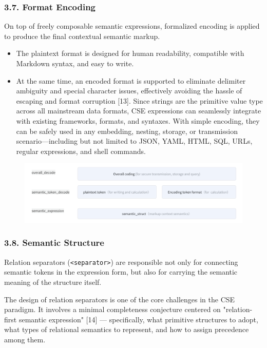 \documentclass[conference]{IEEEtran}
\begin{document}
\subsubsection{3.7. Format Encoding}\label{37-format-encoding}

On top of freely composable semantic expressions, formalized encoding is
applied to produce the final contextual semantic markup.

\begin{itemize}
\item
  The plaintext format is designed for human readability, compatible
  with Markdown syntax, and easy to write.
\item
  At the same time, an encoded format is supported to eliminate
  delimiter ambiguity and special character issues, effectively avoiding
  the hassle of escaping and format corruption {[}13{]}. Since strings
  are the primitive value type across all mainstream data formats, CSE
  expressions can seamlessly integrate with existing frameworks,
  formats, and syntaxes. With simple encoding, they can be safely used
  in any embedding, nesting, storage, or transmission
  scenario---including but not limited to JSON, YAML, HTML, SQL, URLs,
  regular expressions, and shell commands.
\end{itemize}

\begin{figure}[htbp]
\centering
\includegraphics[width=0.8\linewidth]{assets/image-20250418111424824.png}
\end{figure}


\subsubsection{3.8. Semantic Structure}\label{38-semantic-structure}

Relation separators (\texttt{\textless{}separator\textgreater{}}) are
responsible not only for connecting semantic tokens in the expression
form, but also for carrying the semantic meaning of the structure
itself.

The design of relation separators is one of the core challenges in the
CSE paradigm. It involves a minimal completeness conjecture centered on
"relation-first semantic expression" {[}14{]} --- specifically, what
primitive structures to adopt, what types of relational semantics to
represent, and how to assign precedence among them.
\end{document}
